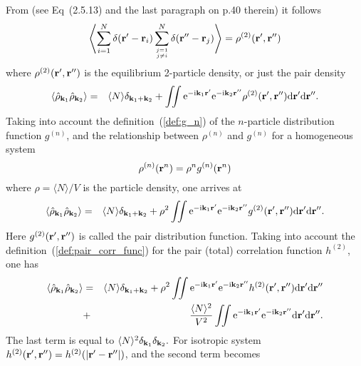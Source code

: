 From \cite{HANSEN2013ch2} (see Eq~(2.5.13) and the last paragraph on p.40 therein) it follows
\begin{equation}
	\left\langle \sum_{i=1}^N  \delta(\vb r'- \vb r_i) \sum_{j=1 \atop j\neq i}^N \delta(\vb r'' - \vb r_j) \right\rangle = \rho^{(2)}(\vb r', \vb r'')
\end{equation}
where $\rho^{(2)}(\vb r', \vb r'')$ is the equilibrium 2-particle density, or just the pair density
\begin{eqnarray}
	\langle \hat{\rho}_{\vb k_1} \hat{\rho}_{\vb k_2} \rangle &=& \langle N \rangle\delta_{\vb k_1 + \vb k_2} + 
	\iint {\rm e}^{-{\rm i}\vb k_1\vb r'} {\rm e}^{-{\rm i}\vb k_2\vb r''}  
	\rho^{(2)}(\vb r', \vb r'') {\rm d} {\vb r'} {\rm d} {\vb r''}.
\end{eqnarray}
Taking into account the definition~(\ref{def:g_n}) of the $n$-particle distribution function $g^{(n)}$, and the relationship between $\rho^{(n)}$ and $g^{(n)}$ for a homogeneous system
\begin{equation}
	\rho^{(n)}(\vb r^n) = \rho^n g^{(n)}(\vb r^n)
\end{equation}
where $\rho = \langle N \rangle / V$ is the particle density, one arrives at
\begin{eqnarray}
	\langle \hat{\rho}_{\vb k_1} \hat{\rho}_{\vb k_2} \rangle &=& \langle N \rangle\delta_{\vb k_1 + \vb k_2} + 
	\rho^2 \iint {\rm e}^{-{\rm i}\vb k_1\vb r'} {\rm e}^{-{\rm i}\vb k_2\vb r''}  
	g^{(2)}(\vb r', \vb r'') {\rm d} {\vb r'} {\rm d} {\vb r''}.
\end{eqnarray}
Here $g^{(2)}(\vb r', \vb r'')$ is called the pair distribution function.
Taking into account the definition~(\ref{def:pair_corr_func}) for the pair (total) correlation function $h^{(2)}$, one has
\begin{eqnarray}
	\langle \hat{\rho}_{\vb k_1} \hat{\rho}_{\vb k_2} \rangle &=& \langle N \rangle\delta_{\vb k_1 + \vb k_2} + 
	\rho^2 \iint {\rm e}^{-{\rm i}\vb k_1\vb r'} {\rm e}^{-{\rm i}\vb k_2\vb r''}  
	h^{(2)}(\vb r', \vb r'') {\rm d} {\vb r'} {\rm d} {\vb r''}
	\nonumber\\
	&+& \frac{\langle N \rangle^2}{V^2}\iint {\rm e}^{-{\rm i}\vb k_1\vb r'} {\rm e}^{-{\rm i}\vb k_2\vb r''} {\rm d} {\vb r'} {\rm d} {\vb r''}.
\end{eqnarray}
The last term is equal to $\langle N \rangle^2 \delta_{\vb k_1}\delta_{\vb k_2}.$ 
For isotropic system $h^{(2)}(\vb r', \vb r'') = h^{(2)}(\abs{\vb r' - \vb r''})$, and the second term becomes
